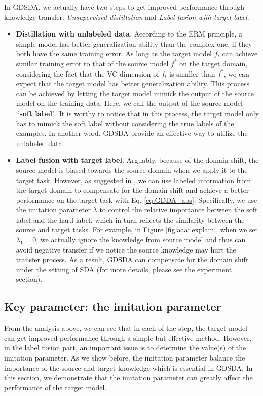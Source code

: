 In GDSDA, we actually have two steps to get improved performance through knowledge transfer: \textit{Unsupervised distillation} and \textit{Label fusion with target label}.
\begin{itemize}
	\item \textbf{Distillation with unlabeled data}. According to the ERM principle\cite{vapnik1999overview}, a simple model has better generalization ability than the complex one, if they both have the same training error.
	As long as the target model $f_t$ can achieve similar training error to that of the source model $f^*$ on the target domain, considering the fact that the VC dimension of $f_t$ is smaller than $f^*$, we can expect that the target model has better generalization ability. This process can be achieved by letting the target model mimick the output of the source model on the training data. Here, we call the output of the source model ``\textbf{soft label}".
	It is worthy to notice that in this process, the target model only has to mimick the soft label without considering the true labels of the examples. In another word, GDSDA provide an effective way to utilize the unlabeled data.
	\item \textbf{Label fusion with target label}. Arguably, because of the domain shift, the source model is biased towards the source domain when we apply it to the target task. However, as suggested in \cite{hinton2015distilling}, we can use labeled information from the target domain to compensate for the domain shift and achieve a better performance on the target task with Eq. \eqref{eq:GDDA_abs}. Specifically, we use the imitation parameter $\lambda$ to control the relative importance between the soft label and the hard label, which in turn reflects the similarity between the source and target tasks. 
	For example, in Figure \ref{fig:aaai:explain}, when we set $\lambda_1=0$, we actually ignore the knowledge from source model and thus can avoid negative transfer if we notice the source knowledge may hurt the transfer process.
	As a result, GDSDA can compensate for the domain shift under the setting of SDA (for more details, please see the experiment section).
\end{itemize}




\subsection{Key parameter: the imitation parameter}\label{sec:aaai:key}
From the analysis above, we can see that in each of the step, the target model can get improved performance through a simple but effective method. However, in the label fusion part, an important issue is to determine the value(s) of the imitation parameter. As we show before, the imitation parameter balance the importance of the source and target knowledge which is essential in GDSDA. In this section, we demonstrate that the imitation parameter can greatly affect the performance of the target model.

